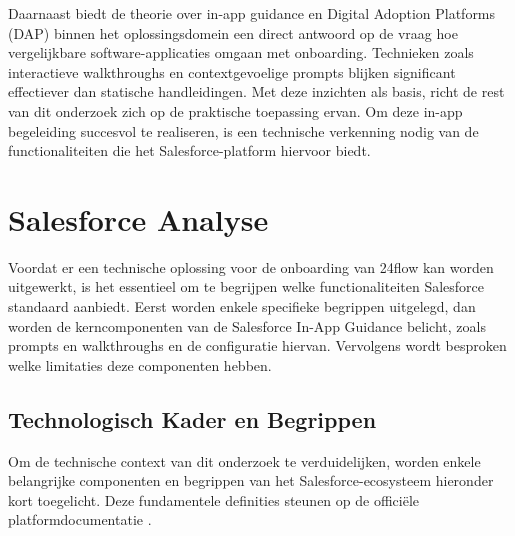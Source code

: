 Daarnaast biedt de theorie over in-app guidance en Digital Adoption Platforms (DAP) binnen het oplossingsdomein een direct antwoord op de vraag hoe vergelijkbare software-applicaties omgaan met onboarding. Technieken zoals interactieve walkthroughs en contextgevoelige prompts blijken significant effectiever dan statische handleidingen. Met deze inzichten als basis, richt de rest van dit onderzoek zich op de praktische toepassing ervan. Om deze in-app begeleiding succesvol te realiseren, is een technische verkenning nodig van de functionaliteiten die het Salesforce-platform hiervoor biedt.
\\


\section{Salesforce Analyse}%
\label{sec:Salesforce analyse}
Voordat er een technische oplossing voor de onboarding van 24flow kan worden uitgewerkt, is het essentieel om te begrijpen welke functionaliteiten Salesforce standaard aanbiedt. Eerst worden enkele specifieke begrippen uitgelegd, dan worden de kerncomponenten van de Salesforce In-App Guidance belicht, zoals prompts en walkthroughs en de configuratie hiervan. Vervolgens wordt besproken welke limitaties deze componenten hebben. 
\\

\subsection{Technologisch Kader en Begrippen}
Om de technische context van dit onderzoek te verduidelijken, worden enkele belangrijke componenten en begrippen van het Salesforce-ecosysteem hieronder kort toegelicht. Deze fundamentele definities steunen op de officiële platformdocumentatie \autocite{SalesforceDevDocs}.

